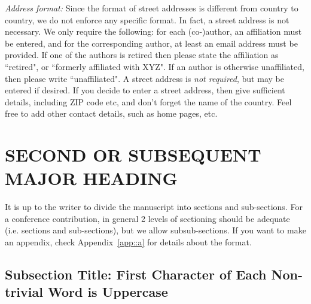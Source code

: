 \documentclass[12pt]{article}
\begin{document}
\emph{Address format:} Since the format of street addresses is different from country to country, we do not enforce any specific format. In fact, a street address is not necessary. We only require the following: for each (co-)author, an affiliation must be entered, and for the corresponding author, at least an email address must be provided. If one of the authors is retired then please state the affiliation as ``retired", or ``formerly affiliated with XYZ". If an author is otherwise unaffiliated, then please write ``unaffiliated". A street address is \emph{not required}, but may be entered if desired. If you decide to enter a street address, then give sufficient details, including ZIP code etc, and don't forget the name of the country. Feel free to add other contact details, such as home pages, etc.

%
\section{SECOND OR SUBSEQUENT MAJOR HEADING}
\label{sect::second}

It is up to the writer to divide the manuscript into sections and sub-sections. For a conference contribution, in general 2 levels of sectioning should be adequate (i.e. sections and sub-sections), but we allow subsub-sections. If you want to make an appendix, check Appendix~\ref{app::a} for details about the format.

%
\subsection{Subsection Title: First Character of Each Non-trivial Word is Uppercase}
\label{subsect::major}
\end{document}
